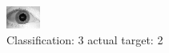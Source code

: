\begin{figure}[h!]
\begin{center}
\includegraphics[width=0.60\columnwidth]{figures/ID1658_class_3_target_2.png}
\end{center}
\caption{ Classification: 3 actual target: 2}
\label{fig:ID1658_class_3_target_2}
\end{figure}
